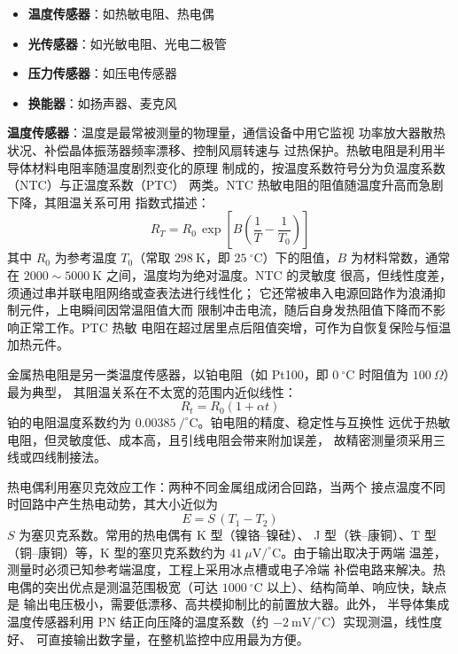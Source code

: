 \begin{itemize}
    \item \textbf{温度传感器}：如热敏电阻、热电偶
    \item \textbf{光传感器}：如光敏电阻、光电二极管
    \item \textbf{压力传感器}：如压电传感器
    \item \textbf{换能器}：如扬声器、麦克风
\end{itemize}

\textbf{温度传感器}：温度是最常被测量的物理量，通信设备中用它监视
功率放大器散热状况、补偿晶体振荡器频率漂移、控制风扇转速与
过热保护。热敏电阻是利用半导体材料电阻率随温度剧烈变化的原理
制成的，按温度系数符号分为负温度系数（NTC）与正温度系数（PTC）
两类。NTC 热敏电阻的阻值随温度升高而急剧下降，其阻温关系可用
指数式描述：
\begin{equation}
R_T = R_0\,\exp\!\left[B\left(\frac{1}{T} - \frac{1}{T_0}\right)\right]
\end{equation}
其中 $R_0$ 为参考温度 $T_0$（常取 $298\ \mathrm{K}$，即
$25\ ^{\circ}\mathrm{C}$）下的阻值，$B$ 为材料常数，通常在
$2000\sim5000\ \mathrm{K}$ 之间，温度均为绝对温度。NTC 的灵敏度
很高，但线性度差，须通过串并联电阻网络或查表法进行线性化；
它还常被串入电源回路作为浪涌抑制元件，上电瞬间因常温阻值大而
限制冲击电流，随后自身发热阻值下降而不影响正常工作。PTC 热敏
电阻在超过居里点后阻值突增，可作为自恢复保险与恒温加热元件。

金属热电阻是另一类温度传感器，以铂电阻（如 Pt100，即
$0\ ^{\circ}\mathrm{C}$ 时阻值为 $100\ \Omega$）最为典型，
其阻温关系在不太宽的范围内近似线性：
\[
R_t = R_0\left(1 + \alpha t\right)
\]
铂的电阻温度系数约为
$0.00385\ /^{\circ}\mathrm{C}$。铂电阻的精度、稳定性与互换性
远优于热敏电阻，但灵敏度低、成本高，且引线电阻会带来附加误差，
故精密测量须采用三线或四线制接法。

热电偶利用塞贝克效应工作：两种不同金属组成闭合回路，当两个
接点温度不同时回路中产生热电动势，其大小近似为
\begin{equation}
E = S\,(T_1 - T_2)
\end{equation}
$S$ 为塞贝克系数。常用的热电偶有 K 型（镍铬--镍硅）、
J 型（铁--康铜）、T 型（铜--康铜）等，K 型的塞贝克系数约为
$41\ \mu\mathrm{V}/^{\circ}\mathrm{C}$。由于输出取决于两端
温差，测量时必须已知参考端温度，工程上采用冰点槽或电子冷端
补偿电路来解决。热电偶的突出优点是测温范围极宽（可达
$1000\ ^{\circ}\mathrm{C}$ 以上）、结构简单、响应快，缺点是
输出电压极小，需要低漂移、高共模抑制比的前置放大器。此外，
半导体集成温度传感器利用 PN 结正向压降的温度系数（约
$-2\ \mathrm{mV}/^{\circ}\mathrm{C}$）实现测温，线性度好、
可直接输出数字量，在整机监控中应用最为方便。

